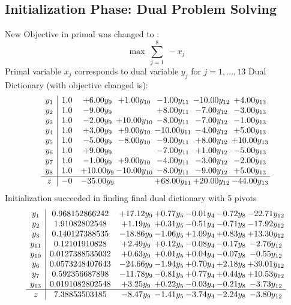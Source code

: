 \documentclass[9pt]{article}
\begin{document}
\subsection{Initialization Phase: Dual Problem Solving}
New Objective in primal was changed to : \[ \max\ \sum_{j=1}^{8}\ - x_j \] 
Primal variable $x_j$ corresponds to dual variable $y_j$ for $j = 1,\ldots,13$
Dual Dictionary (with objective changed is): 
\[\begin{array}{c| c c@{\hskip 2pt} c@{\hskip 2pt} c@{\hskip 2pt} c@{\hskip 2pt} c@{\hskip 2pt} }
 y_{1}   &  1.0 & +  6.00 y_{9} & +  1.00 y_{10} & -1.00 y_{11} & -10.00 y_{12} & +  4.00 y_{13}\\
 y_{2}   &  1.0 & -9.00 y_{9} &   & +  8.00 y_{11} & -7.00 y_{12} & -3.00 y_{13}\\
 y_{3}   &  1.0 & -2.00 y_{9} & + 10.00 y_{10} & -8.00 y_{11} & -7.00 y_{12} & -1.00 y_{13}\\
 y_{4}   &  1.0 & +  3.00 y_{9} & +  9.00 y_{10} & -10.00 y_{11} & -4.00 y_{12} & +  5.00 y_{13}\\
 y_{5}   &  1.0 & -5.00 y_{9} & -8.00 y_{10} & -9.00 y_{11} & +  8.00 y_{12} & + 10.00 y_{13}\\
 y_{6}   &  1.0 & +  9.00 y_{9} &   & -7.00 y_{11} & +  1.00 y_{12} & -5.00 y_{13}\\
 y_{7}   &  1.0 & -1.00 y_{9} & +  9.00 y_{10} & -4.00 y_{11} & -3.00 y_{12} & -2.00 y_{13}\\
 y_{8}   &  1.0 & + 10.00 y_{9} & -10.00 y_{10} & -8.00 y_{11} & -9.00 y_{12} & +  5.00 y_{13}\\
\hline
z    &  -0 & -35.00 y_{9} &   & + 68.00 y_{11} & + 20.00 y_{12} & -44.00 y_{13}\\
\end{array}\]
Initialization succeeded in finding final dual dictionary with 5 pivots
\[\begin{array}{c| c c@{\hskip 2pt} c@{\hskip 2pt} c@{\hskip 2pt} c@{\hskip 2pt} c@{\hskip 2pt} }
 y_{1}   &  0.968152866242 & + 17.12 y_{9} & +  0.77 y_{5} & -0.01 y_{4} & -0.72 y_{8} & -22.71 y_{12}\\
 y_{2}   &  1.91082802548 & +  1.19 y_{9} & +  0.31 y_{5} & -0.51 y_{4} & -0.71 y_{8} & -17.92 y_{12}\\
 y_{3}   &  0.140127388535 & -18.86 y_{9} & -1.06 y_{5} & +  1.09 y_{4} & +  0.83 y_{8} & + 13.30 y_{12}\\
 y_{11}   &  0.12101910828 & +  2.49 y_{9} & +  0.12 y_{5} & -0.08 y_{4} & -0.17 y_{8} & -2.76 y_{12}\\
 y_{10}   &  0.0127388535032 & +  0.63 y_{9} & +  0.01 y_{5} & +  0.04 y_{4} & -0.07 y_{8} & -0.55 y_{12}\\
 y_{6}   &  0.0573248407643 & -24.66 y_{9} & -1.94 y_{5} & +  0.70 y_{4} & +  2.18 y_{8} & + 39.01 y_{12}\\
 y_{7}   &  0.592356687898 & -11.78 y_{9} & -0.81 y_{5} & +  0.77 y_{4} & +  0.44 y_{8} & + 10.53 y_{12}\\
 y_{13}   &  0.0191082802548 & +  3.25 y_{9} & +  0.22 y_{5} & -0.03 y_{4} & -0.21 y_{8} & -3.73 y_{12}\\
\hline
z    &  7.38853503185 & -8.47 y_{9} & -1.41 y_{5} & -3.74 y_{4} & -2.24 y_{8} & -3.80 y_{12}\\
\end{array}\]
\end{document}
